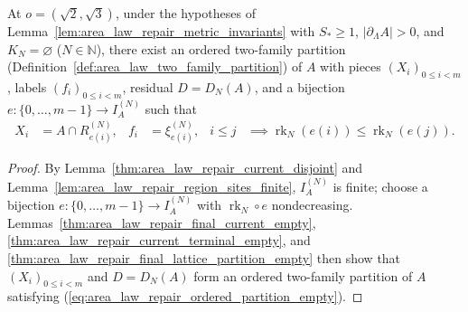 \begin{lemma}
    \label{thm:area_law_repair_ordered_partition_empty}
    \leanok
    At $o=(\sqrt2,\sqrt3)$, under the hypotheses of Lemma~\ref{lem:area_law_repair_metric_invariants}
    with $S_*\ge1$, $|\partial_\Lambda A|>0$, and $K_N=\varnothing$ ($N\in\mathbb N$), there exist
    an ordered two-family partition (Definition~\ref{def:area_law_two_family_partition}) of $A$
    with pieces $(X_i)_{0\le i<m}$, labels $(f_i)_{0\le i<m}$, residual $D=D_N(A)$, and a bijection
    $e:\{0,\ldots,m-1\}\to I_A^{(N)}$ such that
    \begin{align}
        X_i    & = A\cap R_{e(i)}^{(N)},                                         &
        f_i    & = \xi_{e(i)}^{(N)},                                             &
        i\le j & \implies \operatorname{rk}_N(e(i))\le\operatorname{rk}_N(e(j)).
        \label{eq:area_law_repair_ordered_partition_empty}
    \end{align}
\end{lemma}

\begin{proof}
    \leanok
    By Lemma~\ref{thm:area_law_repair_current_disjoint} and
    Lemma~\ref{lem:area_law_repair_region_sites_finite}, $I_A^{(N)}$ is finite; choose a bijection
    $e:\{0,\ldots,m-1\}\to I_A^{(N)}$ with $\operatorname{rk}_N\circ e$ nondecreasing.
    Lemmas~\ref{thm:area_law_repair_final_current_empty},
    \ref{thm:area_law_repair_current_terminal_empty}, and
    \ref{thm:area_law_repair_final_lattice_partition_empty} then show that $(X_i)_{0\le i<m}$ and
    $D=D_N(A)$ form an ordered two-family partition of $A$ satisfying
    (\ref{eq:area_law_repair_ordered_partition_empty}).
\end{proof}

